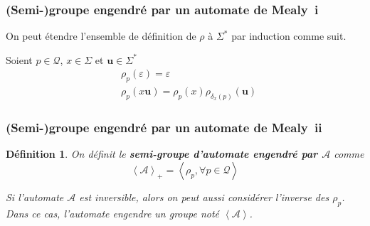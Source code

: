 \documentclass[11pt]{beamer}
\newtheorem{defi}{Définition}
\begin{document}
\begin{frame}
  \frametitle{(Semi-)groupe engendré par un automate de Mealy~i}

  On peut étendre l'ensemble de définition de $\rho$ à $\Sigma^*$ par induction comme suit.

  Soient $p\in\mathcal{Q}$, $x\in\Sigma$ et $\textbf{u}\in\Sigma^*$
  \begin{align*}
    &\rho_p(\varepsilon)=\varepsilon \\
    &\rho_p(x\textbf{u})=\rho_p(x)\rho_{\delta_x(p)}(\textbf{u})
  \end{align*}


\begin{figure}[!ht]
  \begin{center}
  \end{center}
\end{figure}

\end{frame}

\begin{frame}
  \frametitle{(Semi-)groupe engendré par un automate de Mealy~ii}

  \begin{defi}
    On définit le \textbf{semi-groupe d'automate engendré par $\mathcal{A}$} comme
    \begin{equation*}
      \left<\mathcal{A}\right>_+=\left<\rho_p, \forall p\in\mathcal{Q}\right>
    \end{equation*}

    Si l'automate $\mathcal{A}$ est inversible, alors on peut aussi considérer l'inverse des $\rho_p$. Dans ce cas, l'automate engendre un groupe noté $\left<\mathcal{A}\right>$.

  \end{defi}
\end{frame}
\end{document}
